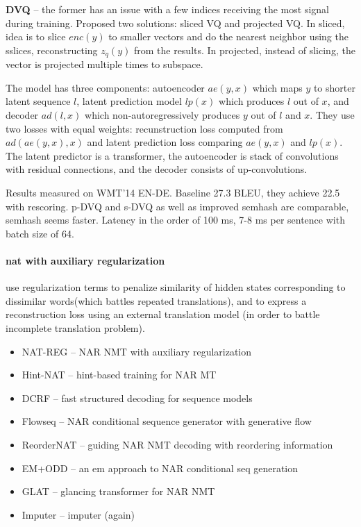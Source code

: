 \textbf{DVQ} -- the former has an issue with a few indices receiving the most signal
during training. Proposed two solutions: sliced VQ and projected VQ. In sliced,
idea is to slice $enc(y)$ to smaller vectors and do the nearest neighbor using
the sslices, reconstructing $z_q(y)$ from the results. In projected, instead of
slicing, the vector is projected multiple times to subspace.

The model has three components: autoencoder $ae(y, x)$ which maps $y$ to shorter
latent sequence $l$, latent prediction model $lp(x)$ which produces $l$ out of
$x$, and decoder $ad(l, x)$ which non-autoregressively produces $y$ out of $l$
and $x$. They use two losses with equal weights: recunstruction loss computed
from $ad(ae(y,x),x)$ and latent prediction loss comparing $ae(y,x)$ and $lp(x)$.
The latent predictor is a transformer, the autoencoder is stack of convolutions
with residual connections, and the decoder consists of up-convolutions.

Results measured on WMT'14 EN-DE. Baseline 27.3 BLEU, they achieve 22.5 with
rescoring. p-DVQ and s-DVQ as well as improved semhash are comparable, semhash
seems faster. Latency in the order of 100 ms, 7-8 ms per sentence with batch
size of 64.



\paragraph{\Ac{nat} with auxiliary regularization}
\citet{wang2019nonautoregressive} use regularization terms to penalize
similarity of hidden states corresponding to dissimilar words(which battles
repeated translations), and to express a reconstruction loss using an external
translation model (in order to battle incomplete translation problem).



\begin{itemize}
\item NAT-REG \citep{wang2019nonautoregressive} -- NAR NMT with auxiliary regularization
\item Hint-NAT \citep{li2019hint} -- hint-based training for NAR MT
\item DCRF \citep{sun2019fast} -- fast structured decoding for sequence models
\item Flowseq \citep{ma2019flowseq} -- NAR conditional sequence generator with generative flow
\item ReorderNAT \citep{ran2019guiding} -- guiding NAR NMT decoding with reordering information
\item EM+ODD \citep{sun2020em} -- an em approach to NAR conditional seq generation
\item GLAT \citep{qian2020glancing} -- glancing transformer for NAR NMT
\item Imputer \citep{saharia2020nonautoregressive} -- imputer (again)
\end{itemize}


